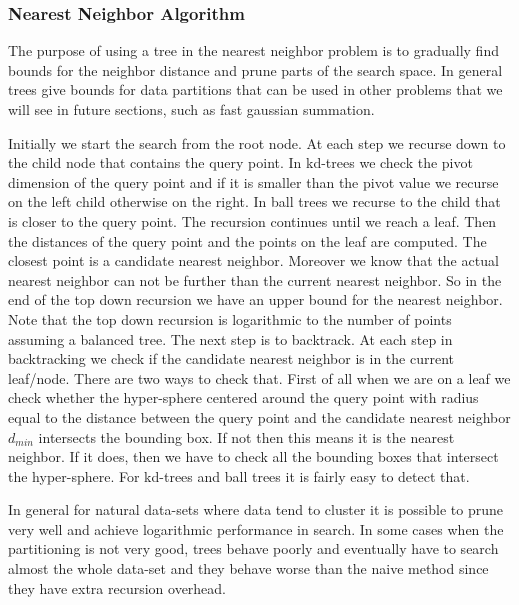 \documentclass[12pt,letterpaper,doublespaced,ETD,dvips,proposal]{gtthesis}
\begin{document}
\begin{Body}
\subsubsection{Nearest Neighbor Algorithm}
The purpose of using a tree in the nearest neighbor problem is to
gradually find bounds for the neighbor distance and prune parts of
the search space. In general trees give bounds for data partitions
that can be used in other problems that we will see in future
sections, such as fast gaussian summation.

Initially we start the search from the root node. At each step we
 recurse down to the child node that contains the query point.
In kd-trees we check the pivot dimension of the query point and if
it is smaller than the pivot value we recurse on the left child
otherwise on the right. In ball trees we recurse to the child that
is closer to the query point. The recursion continues until we reach
a leaf. Then the distances of the query point and the points on the
leaf are computed. The closest point is a candidate nearest
neighbor. Moreover we know that the actual nearest neighbor can not
be further than the current nearest neighbor. So in the end of the
top down recursion we have an upper bound for the nearest neighbor.
Note that the top down recursion is logarithmic to the number of
points assuming a balanced tree. The next step is to backtrack. At
each step in backtracking we check if the candidate nearest neighbor
is in the current leaf/node. There are two ways to check that. First
of all when we are on a leaf we check whether the hyper-sphere
centered around the query point with radius equal to the distance
 between the query point and the candidate nearest neighbor
 $d_{min}$ intersects the bounding box. If not then this means it is
 the nearest neighbor. If it does, then we have to check all the
 bounding boxes that intersect the hyper-sphere. For kd-trees and
 ball trees it is fairly easy to detect that.

 In general for natural data-sets where data tend to cluster it is
 possible to prune very well  and achieve logarithmic performance in
 search. In some cases when the partitioning is not very good, trees
 behave poorly and eventually have to search almost the whole
 data-set and they behave worse than the naive method since they
 have extra recursion overhead.


\end{Body}
\end{document}
